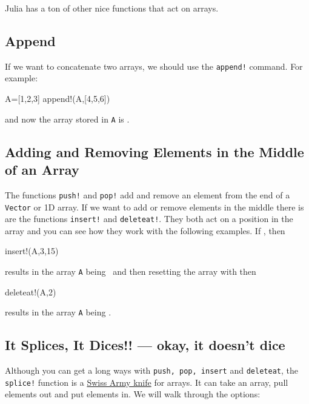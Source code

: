 Julia has a ton of other nice functions that act on arrays. 

\subsection{Append}

If we want
to concatenate two arrays, we should use the \texttt{append!} command.
For example:

\begin{jlblock}
A=[1,2,3]
append!(A,[4,5,6])
\end{jlblock}
%
and now the array stored in \texttt{A} is  \printpythontex[verb]. 

\subsection{Adding and Removing Elements in the Middle of an Array}

The functions \verb|push!| and \verb|pop!| add and remove an element from the end of a \verb|Vector| or 1D array.  If we want to add or remove elements in the middle there is are the functions \verb|insert!| and \verb|deleteat!|.  They both act on a position in the array and you can see how they work with the following examples.  If , then 
\begin{jlblock}[array]
insert!(A,3,15)
\end{jlblock}
results in the array \verb!A! being  \printpythontex[verb]~and then resetting the array with  then
\begin{jlblock}[array]
deleteat!(A,2)
\end{jlblock}
results in the array \verb!A! being  \printpythontex[verb].

\subsection{It Splices, It Dices!! --- okay, it doesn't dice}

Although you can get a long ways with \texttt{push, pop, insert} and \texttt{deleteat}, the \texttt{splice!} function is a
\href{https://en.wikipedia.org/wiki/Swiss_Army_knife}{Swiss Army knife}
for arrays. It can take an array, pull elements out and put elements in. We will walk through the options: 

